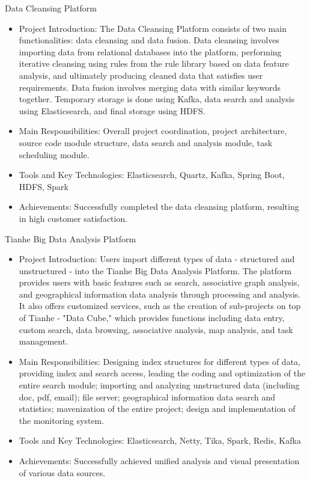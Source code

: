 \documentclass{resume}
\begin{document}
Data Cleansing Platform
\begin{itemize}
\item Project Introduction: The Data Cleansing Platform consists of two main functionalities: data cleansing and data fusion. Data cleansing involves importing data from relational databases into the platform, performing iterative cleansing using rules from the rule library based on data feature analysis, and ultimately producing cleaned data that satisfies user requirements. Data fusion involves merging data with similar keywords together. Temporary storage is done using Kafka, data search and analysis using Elasticsearch, and final storage using HDFS.
\item Main Responsibilities: Overall project coordination, project architecture, source code module structure, data search and analysis module, task scheduling module.
\item Tools and Key Technologies: Elasticsearch, Quartz, Kafka, Spring Boot, HDFS, Spark
\item Achievements: Successfully completed the data cleansing platform, resulting in high customer satisfaction.
\end{itemize}
Tianhe Big Data Analysis Platform
\begin{itemize}
\item Project Introduction: Users import different types of data - structured and unstructured - into the Tianhe Big Data Analysis Platform. The platform provides users with basic features such as search, associative graph analysis, and geographical information data analysis through processing and analysis. It also offers customized services, such as the creation of sub-projects on top of Tianhe - "Data Cube," which provides functions including data entry, custom search, data browsing, associative analysis, map analysis, and task management.
\item Main Responsibilities: Designing index structures for different types of data, providing index and search access, leading the coding and optimization of the entire search module; importing and analyzing unstructured data (including doc, pdf, email); file server; geographical information data search and statistics; mavenization of the entire project; design and implementation of the monitoring system.
\item Tools and Key Technologies: Elasticsearch, Netty, Tika, Spark, Redis, Kafka
\item Achievements: Successfully achieved unified analysis and visual presentation of various data sources.
\end{itemize}
\end{document}
